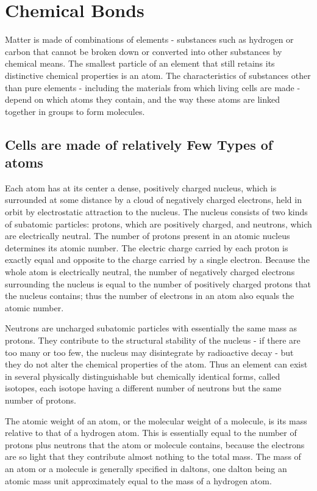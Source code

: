 \section{Chemical Bonds}

Matter is made of combinations of elements - substances such as hydrogen
or carbon that cannot be broken down or converted into other
substances by chemical means. The smallest particle of an element that
still retains its distinctive chemical properties is an atom. The characteristics
of substances other than pure elements - including the materials
from which living cells are made - depend on which atoms they contain,
and the way these atoms are linked together in groups to form molecules.

\subsection{Cells are made of relatively Few Types of atoms}

Each atom has at its center a dense, positively charged nucleus, which
is surrounded at some distance by a cloud of negatively charged electrons,
held in orbit by electrostatic attraction to the nucleus.
The nucleus consists of two kinds of subatomic particles: protons, which
are positively charged, and neutrons, which are electrically neutral. The
number of protons present in an atomic nucleus determines its atomic
number. The electric charge carried by each proton is exactly
equal and opposite to the charge carried by a single electron. Because
the whole atom is electrically neutral, the number of negatively charged
electrons surrounding the nucleus is equal to the number of positively
charged protons that the nucleus contains; thus the number of electrons
in an atom also equals the atomic number.

Neutrons are uncharged subatomic particles with essentially the same
mass as protons. They contribute to the structural stability of the nucleus -
if there are too many or too few, the nucleus may disintegrate by
radioactive decay - but they do not alter the chemical properties of the
atom. Thus an element can exist in several physically distinguishable but
chemically identical forms, called isotopes, each isotope having a different
number of neutrons but the same number of protons.

The atomic weight of an atom, or the molecular weight of a molecule,
is its mass relative to that of a hydrogen atom. This is essentially equal to
the number of protons plus neutrons that the atom or molecule contains,
because the electrons are so light that they contribute almost nothing to
the total mass. The mass of an atom or a molecule is generally specified in
daltons, one dalton being an atomic mass unit approximately equal to the mass
of a hydrogen atom.

